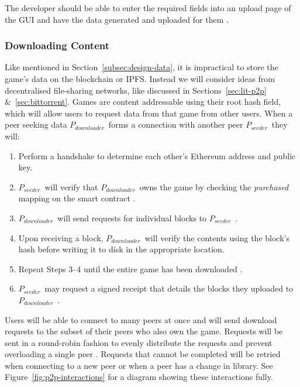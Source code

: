 \vspace{2mm}\noindent
The developer should be able to enter the required fields into an upload page of the GUI and have the data generated and uploaded for them .

\subsubsection*{Downloading Content}

\newcommand{\seeder}{$P_{seeder}$~}
\newcommand{\downloader}{$P_{downloader}$~}

Like mentioned in Section~\ref{subsec:design-data}, it is impractical to store the game's data on the blockchain or IPFS. Instead we will consider ideas from decentralised file-sharing networks, like discussed in Sections~\ref{sec:lit-p2p} \&~\ref{sec:bittorrent}.
\x
Games are content addressable using their root hash field, which will allow users to request data from that game from other users. When a peer seeking data \downloader forms a connection with another peer \seeder they will:

\begin{enumerate}
  \item Perform a handshake to determine each other's Ethereum address and public key.
  \item \seeder will verify that \downloader owns the game by checking the \textit{purchased} mapping on the smart contract  .
  \item \downloader will send requests for individual blocks to \seeder {}.
  \item Upon receiving a block, \downloader will verify the contents using the block's hash  before writing it to disk in the appropriate location.
  \item Repeat Steps 3--4 until the entire game has been downloaded .
  \item \seeder may request a signed receipt that details the blocks they uploaded  to \downloader.
\end{enumerate}

\vspace{2mm}\noindent
Users will be able to connect to many peers at once  and will send download requests to the subset of their peers who also own the game. Requests will be sent in a round-robin fashion to evenly distribute the requests and prevent overloading a single peer . Requests that cannot be completed will be retried when connecting to a new peer or when a peer has a change in library.
\x
See Figure~\ref{fig:p2p-interactions} for a diagram showing these interactions fully.

